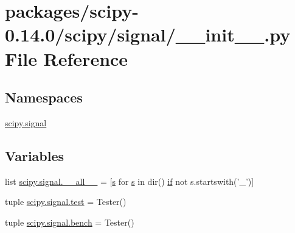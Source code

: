 \hypertarget{packages_2scipy-0_814_80_2scipy_2signal_2____init_____8py}{}\section{packages/scipy-\/0.14.0/scipy/signal/\+\_\+\+\_\+init\+\_\+\+\_\+.py File Reference}
\label{packages_2scipy-0_814_80_2scipy_2signal_2____init_____8py}
\subsection*{Namespaces}
\begin{DoxyCompactItemize}
\item 
 \hyperlink{namespacescipy_1_1signal}{scipy.\+signal}
\end{DoxyCompactItemize}
\subsection*{Variables}
\begin{DoxyCompactItemize}
\item 
list \hyperlink{namespacescipy_1_1signal_a015d8d778f01ce16aeaba6d7cba90fef}{scipy.\+signal.\+\_\+\+\_\+all\+\_\+\+\_\+} = \mbox{[}\hyperlink{indexexpr_8h_ae024b0db549122b44c349ae28ec990dc}{s} for \hyperlink{indexexpr_8h_ae024b0db549122b44c349ae28ec990dc}{s} in dir() \hyperlink{minmax_8h_a30a0ee9fee303f01d9c5e6f669e0dfe9}{if} not s.\+startswith('\+\_\+')\mbox{]}
\item 
tuple \hyperlink{namespacescipy_1_1signal_a80e4b5ecb4456e321bc6461d7e9caf78}{scipy.\+signal.\+test} = Tester()
\item 
tuple \hyperlink{namespacescipy_1_1signal_a71e6242ecfc7f1dc2f1bcd042617ff96}{scipy.\+signal.\+bench} = Tester()
\end{DoxyCompactItemize}
